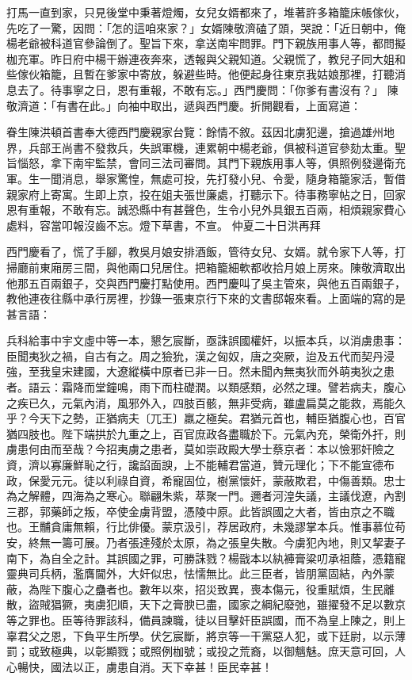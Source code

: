 打馬一直到家，只見後堂中秉著燈燭，女兒女婿都來了，堆著許多箱籠床帳傢伙，先吃了一驚，因問：「怎的這咱來家？」女婿陳敬濟磕了頭，哭說：「近日朝中，俺楊老爺被科道官參論倒了。聖旨下來，拿送南牢問罪。門下親族用事人等，都問擬枷充軍。昨日府中楊干辦連夜奔來，透報與父親知道。父親慌了，教兒子同大姐和些傢伙箱籠，且暫在爹家中寄放，躲避些時。他便起身往東京我姑娘那裡，打聽消息去了。待事寧之日，恩有重報，不敢有忘。」西門慶問：「你爹有書沒有？」 陳敬濟道：「有書在此。」向袖中取出，遞與西門慶。折開觀看，上面寫道：

眷生陳洪頓首書奉大德西門慶親家台覽：餘情不敘。茲因北虜犯邊，搶過雄州地界，兵部王尚書不發救兵，失誤軍機，連累朝中楊老爺，俱被科道官參劾太重。聖旨惱怒，拿下南牢監禁，會同三法司審問。其門下親族用事人等，俱照例發邊衛充軍。生一聞消息，舉家驚惶，無處可投，先打發小兒、令愛，隨身箱籠家活，暫借親家府上寄寓。生即上京，投在姐夫張世廉處，打聽示下。待事務寧帖之日，回家恩有重報，不敢有忘。誠恐縣中有甚聲色，生令小兒外具銀五百兩，相煩親家費心處料，容當叩報沒齒不忘。燈下草書，不宣。
仲夏二十日洪再拜

西門慶看了，慌了手腳，教吳月娘安排酒飯，管待女兒、女婿。就令家下人等，打掃廳前東廂房三間，與他兩口兒居住。把箱籠細軟都收拾月娘上房來。陳敬濟取出他那五百兩銀子，交與西門慶打點使用。西門慶叫了吳主管來，與他五百兩銀子，教他連夜往縣中承行房裡，抄錄一張東京行下來的文書邸報來看。上面端的寫的是甚言語：

兵科給事中宇文虛中等一本，懇乞宸斷，亟誅誤國權奸，以振本兵，以消虜患事：臣聞夷狄之禍，自古有之。周之獫狁，漢之匈奴，唐之突厥，迨及五代而契丹浸強，至我皇宋建國，大遼縱橫中原者已非一日。然未聞內無夷狄而外萌夷狄之患者。語云：霜降而堂鐘鳴，雨下而柱礎潤。以類感類，必然之理。譬若病夫，腹心之疾已久，元氣內消，風邪外入，四肢百骸，無非受病，雖盧扁莫之能救，焉能久乎？今天下之勢，正猶病夫〔兀王〕羸之極矣。君猶元首也，輔臣猶腹心也，百官猶四肢也。陛下端拱於九重之上，百官庶政各盡職於下。元氣內充，榮衛外扞，則虜患何由而至哉？今招夷虜之患者，莫如崇政殿大學士蔡京者：本以憸邪奸險之資，濟以寡廉鮮恥之行，讒諂面諛，上不能輔君當道，贊元理化；下不能宣德布政，保愛元元。徒以利祿自資，希寵固位，樹黨懷奸，蒙蔽欺君，中傷善類。忠士為之解體，四海為之寒心。聯翩朱紫，萃聚一門。邇者河湟失議，主議伐遼，內割三郡，郭藥師之叛，卒使金虜背盟，憑陵中原。此皆誤國之大者，皆由京之不職也。王黼貪庸無賴，行比俳優。蒙京汲引，荐居政府，未幾謬掌本兵。惟事慕位苟安，終無一籌可展。乃者張達殘於太原，為之張皇失散。今虜犯內地，則又挈妻子南下，為自全之計。其誤國之罪，可勝誅戮？楊戩本以紈褲膏粱叨承祖蔭，憑籍寵靈典司兵柄，濫膺閫外，大奸似忠，怯懦無比。此三臣者，皆朋黨固結，內外蒙蔽，為陛下腹心之蠱者也。數年以來，招災致異，喪本傷元，役重賦煩，生民離散，盜賊猖獗，夷虜犯順，天下之膏腴已盡，國家之綱紀廢弛，雖擢發不足以數京等之罪也。臣等待罪該科，備員諫職，徒以目擊奸臣誤國，而不為皇上陳之，則上辜君父之恩，下負平生所學。伏乞宸斷，將京等一干黨惡人犯，或下廷尉，以示薄罰；或致極典，以彰顯戮；或照例枷號；或投之荒裔，以御魑魅。庶天意可回，人心暢快，國法以正，虜患自消。天下幸甚！臣民幸甚！

